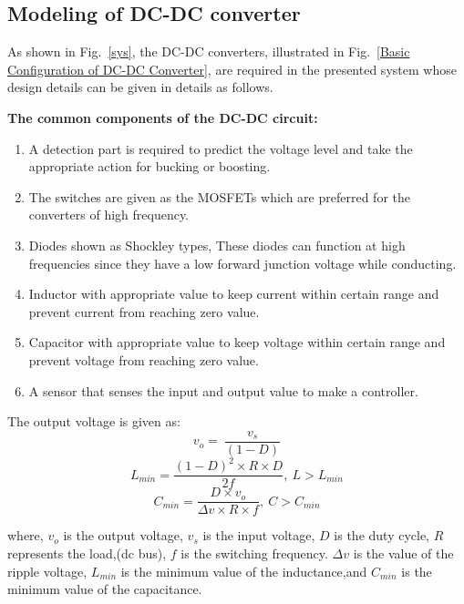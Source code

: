 \documentclass[conference]{IEEEtran}
\begin{document}
\subsection{Modeling of DC-DC converter}
As shown in Fig.~\ref{sys}, the DC-DC converters, illustrated in Fig.~\ref{Basic Configuration of DC-DC Converter}, are required in the presented system whose design details can be given in details as follows.


\textbf{The common components of the DC-DC circuit:}

\begin{enumerate}
	\item A detection part is required to predict the voltage level and take the appropriate action for bucking or boosting.
	\item The switches are given as the MOSFETs which are preferred for the converters of high frequency.
	\item Diodes shown as Shockley types, These diodes can function at high frequencies since they have a low forward junction voltage while conducting.
	\item Inductor with appropriate value to keep current within certain range and prevent current from reaching zero value.
	\item Capacitor with appropriate value to keep voltage within certain range and prevent voltage from reaching zero value.
	\item A sensor that senses the input and output value to make a controller.
\end{enumerate}
The output voltage is given as:
\begin{equation}
	v_o=\ \frac{v_s}{(1-D)}\label{V0}
\end{equation}
\begin{equation}
	L_{min}=\frac{\left(1-D\right)^2 \times R \times D}{2f},\ L>L_{min}\label{lmin}
\end{equation}
\begin{equation}
	{C_{min}=\frac{D\times v_o}{\Delta v\times R \times f}},\ C>C_{min}\label{cmin}
\end{equation}

where, $v_o$ is the output voltage, $v_s$ is the input voltage, $D$ is the duty cycle, $R$  represents the load,(dc bus), $f$ is the switching frequency. $\Delta v$ is the value of the ripple voltage, $L_{min}$ is the minimum value of the inductance,and $C_{min}$ is the minimum value of the capacitance.
\end{document}

